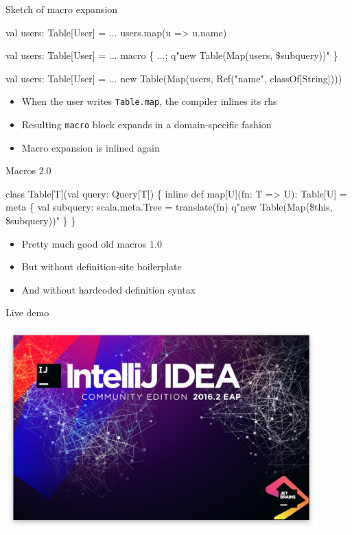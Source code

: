\documentclass[svgnames,dvipsnames,hyperref={bookmarks=false},usepdftitle=false]{beamer}
\begin{document}
\begin{frame}[fragile]{Sketch of macro expansion}
\begin{semiverbatim}
val users: Table[User] = ...
users.map(u => u.name)

                          \arrowdown

val users: Table[User] = ...
macro \{ ...; q"new Table(Map(users, \$subquery))" \}

                          \arrowdown

val users: Table[User] = ...
new Table(Map(users, Ref("name", classOf[String])))
\end{semiverbatim}
\vskip5pt
\begin{itemize}
\item When the user writes \texttt{Table.map}, the compiler inlines its rhs
\item Resulting \texttt{macro} block expands in a domain-specific fashion
\item Macro expansion is inlined again
\end{itemize}
\end{frame}

\begin{frame}[fragile]{Macros 2.0}
\begin{semiverbatim}
class Table[T](val query: Query[T]) \{
  inline def map[U](fn: T => U): Table[U] = \alert{meta} \{
    val subquery: scala.meta.Tree = translate(fn)
    q"new Table(Map(\$this, \$subquery))"
  \}
\}

\end{semiverbatim}
\begin{itemize}
\item Pretty much good old macros 1.0
\item But without definition-site boilerplate
\item And without hardcoded definition syntax
\end{itemize}
\end{frame}

\begin{frame}[c, fragile]{Live demo}
\vskip20pt
\begin{center}
\includegraphics[width=12cm]{intellij.jpg}
\end{center}
\end{frame}
\end{document}
